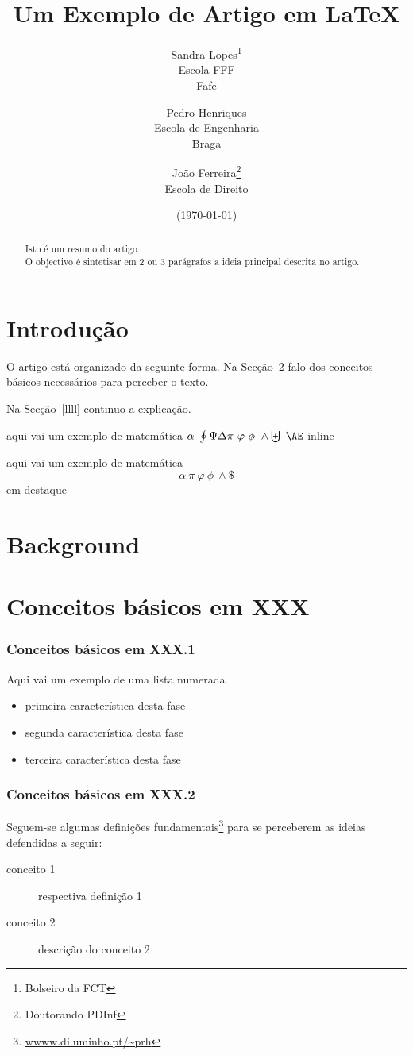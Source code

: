 \documentclass{article}
\title{Um Exemplo de Artigo em \LaTeX}
\author{Sandra Lopes\thanks{Bolseiro da FCT}\\Escola FFF\\ Fafe
        \and
        Pedro Henriques\\Escola de Engenharia\\ Braga
        \and João Ferreira\thanks{Doutorando PDInf}\\ Escola de Direito }
\date{ (\today)}
\begin{document}
\maketitle

\begin{abstract}
\noindent Isto é um resumo do artigo.\\
O objectivo é sintetisar em 2 ou 3 parágrafos a ideia principal descrita no artigo.
\end{abstract}

\tableofcontents

\section{Introdução} \label{intro}

O artigo está organizado da seguinte forma.
Na Secção~\ref{backg} falo dos conceitos básicos necessários para perceber o texto.

Na Secção~\ref{llll} continuo a explicação.


aqui vai um exemplo de matemática $\alpha\   \oint   \Psi \Delta \pi \  \varphi\ \phi\ \wedge \biguplus\ {\AE}  $ inline

aqui vai um exemplo de matemática \[ \alpha\   \pi \  \varphi\ \phi\ \wedge \$ \] em destaque


\section{Background} \label{backg}
\section{Conceitos básicos em XXX}
\subsubsection{Conceitos básicos em XXX.1}
Aqui vai um exemplo de uma lista numerada
\begin{itemize}
\item primeira característica desta fase
\item segunda característica desta fase
\item terceira característica desta fase
\end{itemize}

\subsubsection{Conceitos básicos em XXX.2}
Seguem-se algumas definições fundamentais\footnote{\url{wwww.di.uminho.pt/~prh}} para se perceberem as ideias
defendidas a seguir:
\begin{description}
\item[conceito 1] respectiva definição 1
\item[conceito 2] descrição do  conceito 2
\end{description}
\end{document}
